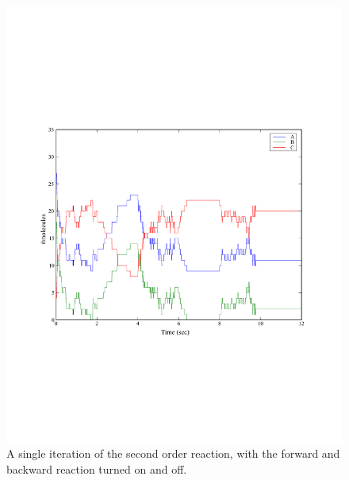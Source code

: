 \documentclass[a4paper,12pt]{book}
\begin{document}
\begin{figure}
\centering
\includegraphics[width=13cm]{secondorderreaction07.pdf}
\caption{A single iteration of the second order reaction, with the forward and backward reaction turned on and off.}
\label{fig:secondorderreaction07}
\end{figure}
\end{document}
